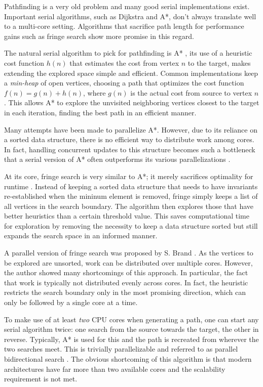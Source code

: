 Pathfinding is a very old problem and many good serial implementations exist.
Important serial algorithms, such as Dijkstra and A*, don't always translate well to a multi-core setting. 
Algorithms that sacrifice path length for performance gains such as fringe search \cite{Fringe} show more promise in this regard.

The natural serial algorithm to pick for pathfinding is A* \cite{A*}, its use of a heuristic cost function $h(n)$ that estimates the cost from vertex $n$ to the target, makes extending the explored space simple and efficient. 
Common implementations keep a \textit{min-heap} of open vertices, choosing a path that optimizes the cost function $f(n) = g(n) + h(n)$, where $g(n)$ is the actual cost from source to vertex $n$.
This allows A* to explore the unvisited neighboring vertices closest to the target in each iteration, finding the best path in an efficient manner.

Many attempts have been made to parallelize A*. However, due to its reliance on a sorted data structure, there is no efficient way to distribute work among cores. In fact, handling concurrent updates to this structure becomes such a bottleneck that a serial version of A* often outperforms its various parallelizations \cite{parallel-astar}. 

At its core, fringe search is very similar to A*; it merely sacrifices optimality for runtime \cite{Fringe}.
Instead of keeping a sorted data structure that needs to have invariants re-established when the mininum element is removed, fringe simply keeps a list of all vertices in the search boundary. 
The algorithm then explores those that have better heuristics than a certain threshold value.
This saves computational time for exploration by removing the necessity to keep a data structure sorted but still expands the search space in an informed manner.

A parallel version of fringe search was proposed by S. Brand \cite{distributed-fringe}. As the vertices to be explored are unsorted, work can be distributed over multiple cores. 
However, the author showed many shortcomings of this approach. In particular, the fact that work is typically not distributed evenly across cores. 
In fact, the heuristic restricts the search boundary only in the most promising direction, which can only be followed by a single core at a time.

To make use of at least \textit{two} CPU cores when generating a path, one can start any serial algorithm twice: one search from the source towards the target, the other in reverse.
Typically, A* is used for this and the path is recreated from wherever the two searches meet. This is trivially parallelizable and referred to as parallel bidirectional search \cite{PRS}. The obvious shortcoming of this algorithm is that modern architectures have far more than two available cores and the scalability requirement is not met.